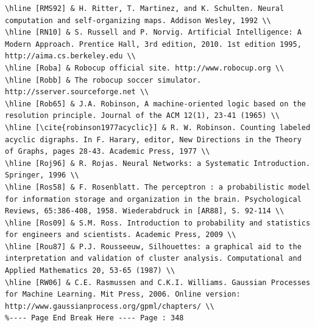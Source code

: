 \documentclass[10pt]{article}
\begin{document}
\begin{verbatim}
\hline [RMS92] & H. Ritter, T. Martinez, and K. Schulten. Neural computation and self-organizing maps. Addison Wesley, 1992 \\
\hline [RN10] & S. Russell and P. Norvig. Artificial Intelligence: A Modern Approach. Prentice Hall, 3rd edition, 2010. 1st edition 1995, http://aima.cs.berkeley.edu \\
\hline [Roba] & Robocup official site. http://www.robocup.org \\
\hline [Robb] & The robocup soccer simulator. http://sserver.sourceforge.net \\
\hline [Rob65] & J.A. Robinson, A machine-oriented logic based on the resolution principle. Journal of the ACM 12(1), 23-41 (1965) \\
\hline [\cite{robinson1977acyclic}] & R. W. Robinson. Counting labeled acyclic digraphs. In F. Harary, editor, New Directions in the Theory of Graphs, pages 28-43. Academic Press, 1977 \\
\hline [Roj96] & R. Rojas. Neural Networks: a Systematic Introduction. Springer, 1996 \\
\hline [Ros58] & F. Rosenblatt. The perceptron : a probabilistic model for information storage and organization in the brain. Psychological Reviews, 65:386-408, 1958. Wiederabdruck in [AR88], S. 92-114 \\
\hline [Ros09] & S.M. Ross. Introduction to probability and statistics for engineers and scientists. Academic Press, 2009 \\
\hline [Rou87] & P.J. Rousseeuw, Silhouettes: a graphical aid to the interpretation and validation of cluster analysis. Computational and Applied Mathematics 20, 53-65 (1987) \\
\hline [RW06] & C.E. Rasmussen and C.K.I. Williams. Gaussian Processes for Machine Learning. Mit Press, 2006. Online version: http://www.gaussianprocess.org/gpml/chapters/ \\
%---- Page End Break Here ---- Page : 348


\end{verbatim}
\end{document}
